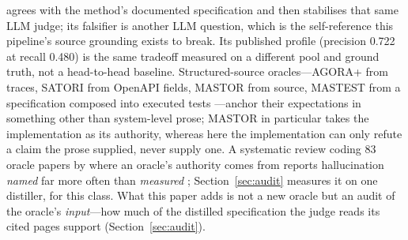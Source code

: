 \documentclass[acmsmall,screen,review,anonymous]{acmart}
\begin{document}
agrees with the method's documented specification and then stabilises that same LLM judge; its
falsifier is another LLM question, which is the self-reference this pipeline's source grounding
exists to break. Its published profile (precision 0.722 at recall 0.480) is the same tradeoff
measured on a different pool and ground truth, not a head-to-head baseline. Structured-source
oracles---AGORA+ from traces, SATORI from OpenAPI fields, MASTOR from source, MASTEST from a
specification composed into executed tests \cite{agoraplus25,satori25,mastor26,mastest26}---anchor
their expectations in something other than system-level prose; MASTOR in particular takes the
implementation as its authority, whereas here the implementation can only refute a claim the prose
supplied, never supply one. A systematic review coding 83 oracle papers by where an oracle's
authority comes from reports hallucination \emph{named} far more often than \emph{measured}
\cite{mughal26}; Section~\ref{sec:audit} measures it on one distiller, for this class. What this
paper adds is not a new oracle but an audit of the oracle's \emph{input}---how much of the distilled
specification the judge reads its cited pages support (Section~\ref{sec:audit}).
\end{document}
